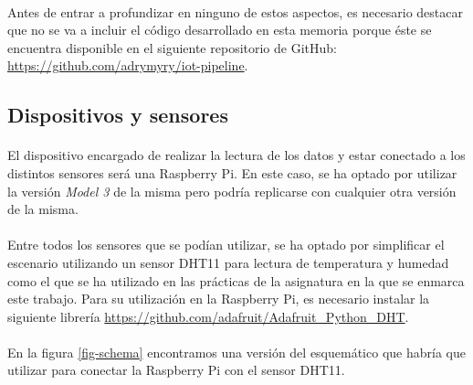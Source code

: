 \documentclass[12pt, a4paper]{article}
\begin{document}
        \paragraph{}
        Antes de entrar a profundizar en ninguno de estos aspectos, es necesario destacar que no se va a incluir el código desarrollado en esta memoria porque éste se encuentra disponible en el siguiente repositorio de GitHub: \url{https://github.com/adrymyry/iot-pipeline}.

        \subsection{Dispositivos y sensores}
        
        \paragraph{}
        El dispositivo encargado de realizar la lectura de los datos y estar conectado a los distintos sensores será una Raspberry Pi. En este caso, se ha optado por utilizar la versión \textit{Model 3} de la misma pero podría replicarse con cualquier otra versión de la misma.

        \paragraph{}
        Entre todos los sensores que se podían utilizar, se ha optado por simplificar el escenario utilizando un sensor DHT11 para lectura de temperatura y humedad como el que se ha utilizado en las prácticas de la asignatura en la que se enmarca este trabajo. Para su utilización en la Raspberry Pi, es necesario instalar la siguiente librería \url{https://github.com/adafruit/Adafruit_Python_DHT}.

        \paragraph{}
        En la figura \ref{fig-schema} encontramos una versión del esquemático que habría que utilizar para conectar la Raspberry Pi con el sensor DHT11.
\end{document}
